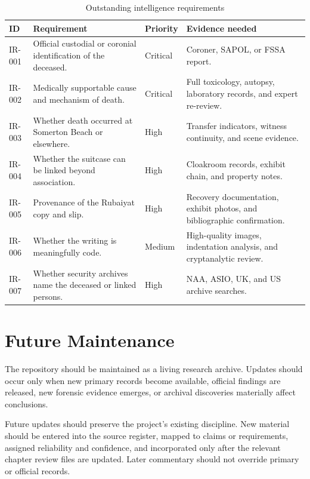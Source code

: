 \begin{table}[htbp]
\centering
\caption{Outstanding intelligence requirements}
\label{tab:chapter12-outstanding-requirements}
\scriptsize
\setlength{\tabcolsep}{2pt}
\renewcommand{\arraystretch}{1.12}
\begin{tabularx}{\textwidth}{>{\raggedright\arraybackslash}p{}>{\raggedright\arraybackslash}p{}>{\raggedright\arraybackslash}p{}>{\raggedright\arraybackslash}X}
\toprule
ID & Requirement & Priority & Evidence needed \\
\midrule
IR-001 & Official custodial or coronial identification of the deceased. & Critical & Coroner, SAPOL, or FSSA report. \\
IR-002 & Medically supportable cause and mechanism of death. & Critical & Full toxicology, autopsy, laboratory records, and expert re-review. \\
IR-003 & Whether death occurred at Somerton Beach or elsewhere. & High & Transfer indicators, witness continuity, and scene evidence. \\
IR-004 & Whether the suitcase can be linked beyond association. & High & Cloakroom records, exhibit chain, and property notes. \\
IR-005 & Provenance of the Rubaiyat copy and slip. & High & Recovery documentation, exhibit photos, and bibliographic confirmation. \\
IR-006 & Whether the writing is meaningfully code. & Medium & High-quality images, indentation analysis, and cryptanalytic review. \\
IR-007 & Whether security archives name the deceased or linked persons. & High & NAA, ASIO, UK, and US archive searches. \\
\bottomrule
\end{tabularx}
\end{table}

\section{Future Maintenance}

The repository should be maintained as a living research archive. Updates should occur only when new primary records become available, official findings are released, new forensic evidence emerges, or archival discoveries materially affect conclusions.

Future updates should preserve the project's existing discipline. New material should be entered into the source register, mapped to claims or requirements, assigned reliability and confidence, and incorporated only after the relevant chapter review files are updated. Later commentary should not override primary or official records.

